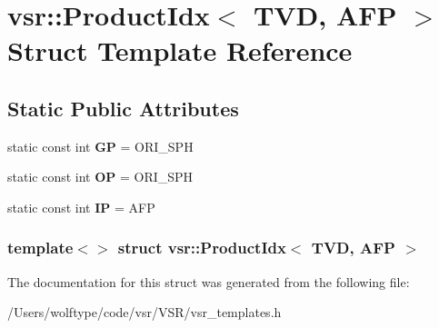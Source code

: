 \hypertarget{structvsr_1_1_product_idx_3_01_t_v_d_00_01_a_f_p_01_4}{\section{vsr\-:\-:Product\-Idx$<$ T\-V\-D, A\-F\-P $>$ Struct Template Reference}
\label{structvsr_1_1_product_idx_3_01_t_v_d_00_01_a_f_p_01_4}
}
\subsection*{Static Public Attributes}
\begin{DoxyCompactItemize}
\item 
\hypertarget{structvsr_1_1_product_idx_3_01_t_v_d_00_01_a_f_p_01_4_afd61a7c263196e6662922d11ee5e78d7}{static const int {\bfseries G\-P} = O\-R\-I\-\_\-\-S\-P\-H}\label{structvsr_1_1_product_idx_3_01_t_v_d_00_01_a_f_p_01_4_afd61a7c263196e6662922d11ee5e78d7}

\item 
\hypertarget{structvsr_1_1_product_idx_3_01_t_v_d_00_01_a_f_p_01_4_aa2077553384c85f32e3b3932ad74823d}{static const int {\bfseries O\-P} = O\-R\-I\-\_\-\-S\-P\-H}\label{structvsr_1_1_product_idx_3_01_t_v_d_00_01_a_f_p_01_4_aa2077553384c85f32e3b3932ad74823d}

\item 
\hypertarget{structvsr_1_1_product_idx_3_01_t_v_d_00_01_a_f_p_01_4_afe88403f1e1b6db39e668d7f3d623144}{static const int {\bfseries I\-P} = A\-F\-P}\label{structvsr_1_1_product_idx_3_01_t_v_d_00_01_a_f_p_01_4_afe88403f1e1b6db39e668d7f3d623144}

\end{DoxyCompactItemize}
\subsubsection*{template$<$$>$ struct vsr\-::\-Product\-Idx$<$ T\-V\-D, A\-F\-P $>$}



The documentation for this struct was generated from the following file\-:\begin{DoxyCompactItemize}
\item 
/\-Users/wolftype/code/vsr/\-V\-S\-R/vsr\-\_\-templates.\-h\end{DoxyCompactItemize}
